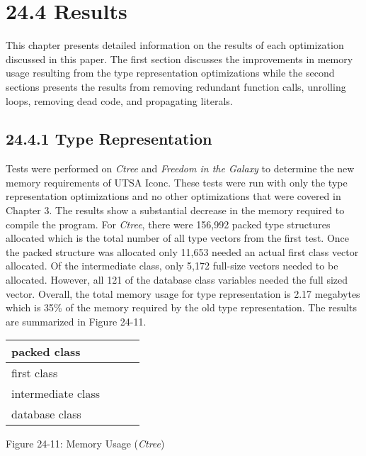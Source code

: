 \section[24.4 Results]{24.4 Results}

This chapter presents detailed information on the results of each
optimization discussed in this paper. The first section discusses the
improvements in memory usage resulting from the type representation
optimizations while the second sections presents the results from
removing redundant function calls, unrolling loops, removing dead
code, and propagating literals.

\subsection[24.4.1 Type Representation]{24.4.1 Type Representation}

Tests were performed on \textit{Ctree} and \textit{Freedom in the
Galaxy} to determine the new memory requirements of UTSA Iconc. These
tests were run with only the type representation optimizations and no
other optimizations that were covered in Chapter 3. The results show a
substantial decrease in the memory required to compile the
program. For \textit{Ctree}, there were 156,992 packed type structures
allocated which is the total number of all type vectors from the first
test. Once the packed structure was allocated only 11,653 needed an
actual first class vector allocated.  Of the intermediate class, only
5,172 full-size vectors needed to be allocated. However, all 121 of
the database class variables needed the full sized vector. Overall,
the total memory usage for type representation is 2.17 megabytes which
is 35\% of the memory required by the old type representation. The
results are summarized in Figure 24-11.

\begin{center}
\tabletail{}
\tablelasttail{}
\begin{xtabular}{|m{1.2163599in}|m{1.1969599in}|m{1.2538599in}|m{1.6636599in}|}
\hline
 packed class &
 &
 &
\raggedleft{}\\\hline
 first class &
 &
 &
\raggedleft{}\\\hline
 intermediate class &
 &
 &
\raggedleft{}\\\hline
 database class &
 &
 &
\raggedleft{}\\\hline
\end{xtabular}
\end{center}
{\centering{}
Figure 24-11: Memory Usage (\textit{Ctree})
\par}


